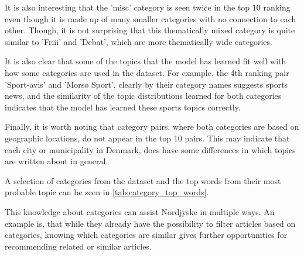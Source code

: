 It is also interesting that the 'misc' category is seen twice in the top 10 ranking even though it is made up of many smaller categories with no connection to each other.
Though, it is not surprising that this thematically mixed category is quite similar to 'Friii' and 'Debat', which are more thematically wide categories.

It is also clear that some of the topics that the model has learned fit well with how some categories are used in the dataset.
For example, the 4th ranking pair 'Sport-avis' and 'Morsø Sport', clearly by their category names suggests sports news, and the similarity of the topic distributions learned for both categories indicates that the model has learned these sports topics correctly.

Finally, it is worth noting that category pairs, where both categories are based on geographic locations, do not appear in the top 10 pairs.
This may indicate that each city or municipality in Denmark, does have some differences in which topics are written about in general.

A selection of categories from the dataset and the top words from their most probable topic can be seen in \autoref{tab:category_top_words}.

This knowledge about categories can assist Nordjyske in multiple ways.
An example is, that while they already have the possibility to filter articles based on categories, knowing which categories are similar gives further opportunities for recommending related or similar articles.
